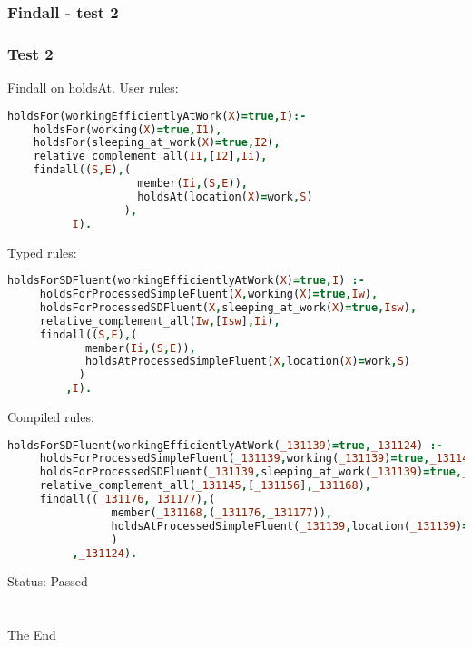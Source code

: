 \documentclass[8pt]{beamer}
\begin{document}
\begin{frame}[fragile]
\frametitle{Findall - test 2}
\subsubsection{Test 2}
\small
Findall on holdsAt.\linebreak
User rules:
\begin{tiny}
\begin{lstlisting}[language=Prolog]
holdsFor(workingEfficientlyAtWork(X)=true,I):-
    holdsFor(working(X)=true,I1),
    holdsFor(sleeping_at_work(X)=true,I2),
    relative_complement_all(I1,[I2],Ii),
    findall((S,E),(
                    member(Ii,(S,E)),
                    holdsAt(location(X)=work,S)
                  ),
          I).
\end{lstlisting}
\end{tiny}
Typed rules:
\begin{tiny}
\begin{lstlisting}[language=Prolog]
holdsForSDFluent(workingEfficientlyAtWork(X)=true,I) :-
     holdsForProcessedSimpleFluent(X,working(X)=true,Iw),
     holdsForProcessedSDFluent(X,sleeping_at_work(X)=true,Isw),
     relative_complement_all(Iw,[Isw],Ii),
     findall((S,E),(
		    member(Ii,(S,E)),
		    holdsAtProcessedSimpleFluent(X,location(X)=work,S)
		   )
	     ,I).
\end{lstlisting}
\end{tiny}
Compiled rules:
\begin{tiny}
\begin{lstlisting}[language=Prolog]
holdsForSDFluent(workingEfficientlyAtWork(_131139)=true,_131124) :-
     holdsForProcessedSimpleFluent(_131139,working(_131139)=true,_131145),
     holdsForProcessedSDFluent(_131139,sleeping_at_work(_131139)=true,_131156),
     relative_complement_all(_131145,[_131156],_131168),
     findall((_131176,_131177),(
				member(_131168,(_131176,_131177)),
				holdsAtProcessedSimpleFluent(_131139,location(_131139)=work,_131176)
				)
	      ,_131124).
\end{lstlisting}
\end{tiny}
Status: Passed
\end{frame}
\section{}
\begin{frame}
\Huge{\centerline{The End}}
\end{frame}

\end{document}
